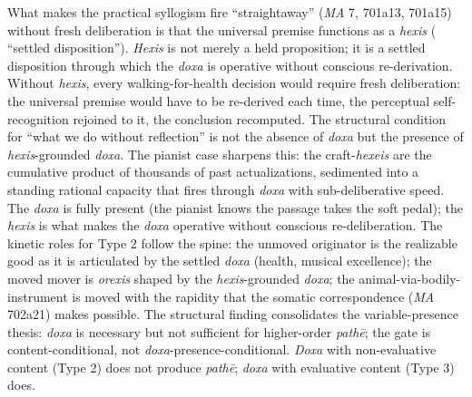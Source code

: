 What makes the practical syllogism fire ``straightaway'' (\textit{MA} 7, 701a13, 701a15) without fresh deliberation is that the universal premise functions as a \textit{hexis} ( ``settled disposition''). \textit{Hexis} is not merely a held proposition; it is a settled disposition through which the \textit{doxa} is operative without conscious re-derivation. Without \textit{hexis}, every walking-for-health decision would require fresh deliberation: the universal premise would have to be re-derived each time, the perceptual self-recognition rejoined to it, the conclusion recomputed. The structural condition for ``what we do without reflection'' is not the absence of \textit{doxa} but the presence of \textit{hexis}-grounded \textit{doxa}. The pianist case sharpens this: the craft-\textit{hexeis} are the cumulative product of thousands of past actualizations, sedimented into a standing rational capacity that fires through \textit{doxa} with sub-deliberative speed. The \textit{doxa} is fully present (the pianist knows the passage takes the soft pedal); the \textit{hexis} is what makes the \textit{doxa} operative without conscious re-deliberation. The kinetic roles for Type 2 follow the spine: the unmoved originator is the realizable good as it is articulated by the settled \textit{doxa} (health, musical excellence); the moved mover is \textit{orexis} shaped by the \textit{hexis}-grounded \textit{doxa}; the animal-via-bodily-instrument is moved with the rapidity that the somatic correspondence (\textit{MA} 702a21) makes possible. The structural finding consolidates the variable-presence thesis: \textit{doxa} is necessary but not sufficient for higher-order \textit{pathē}; the gate is content-conditional, not \textit{doxa}-presence-conditional. \textit{Doxa} with non-evaluative content (Type 2) does not produce \textit{pathē}; \textit{doxa} with evaluative content (Type 3) does.

